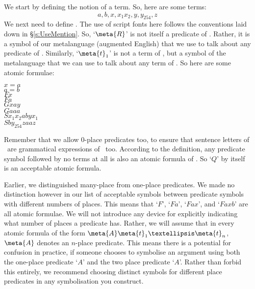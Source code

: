 We start by defining the notion of a term.
So, here are some terms:
	$$a, b, x, x_{1} x_{2}, y, y_{254}, z$$
We next need to define .
The use of script fonts here follows the conventions laid down in §\ref{s:UseMention}. So, `$\meta{R}$' is not itself a predicate of \FOL. Rather, it is a symbol of our metalanguage (augmented English) that we use to talk about any predicate of \FOL. Similarly, `$\meta{t}_{1}$' is not a term of \FOL, but a symbol of the metalanguage that we can use to talk about any term of \FOL. So here are some atomic formulae:
	\begin{center}
		$x = a$\\
		$a = b$\\
		$Fx$\\
		$Fa$\\
		$Gxay$\\
		$Gaaa$\\
		$Sx_{1} x_{2} a b y x_{1}$\\
		$Sby_{254} z a a z$\\
	\end{center}
Remember that we allow $0$-place predicates too, to ensure that sentence letters of \TFL\ are grammatical expressions of \FOL\ too. According to the definition, any predicate symbol followed by no terms at all is also an atomic formula of \FOL. So `$Q$' by itself is an acceptable atomic formula.

Earlier, we distinguished many-place from one-place predicates. We made no distinction however in our list of acceptable symbols between predicate symbols with different numbers of places. This means that `$F$', `$Fa$', `$Fax$', and `$Faxb$' are all atomic formulae. We will not introduce any device for explicitly indicating what number of places a predicate has. Rather, we will assume that in every atomic formula of the form $\meta{A}\meta{t}_{1}…\meta{t}_{n}$, $\meta{A}$ denotes an $n$-place predicate. This means there is a potential for confusion in practice, if someone chooses to symbolise an argument using both the one-place predicate `$A$' and the two place predicate `$A$'. Rather than forbid this entirely, we recommend choosing distinct symbols for different place predicates in any symbolisation you construct.

